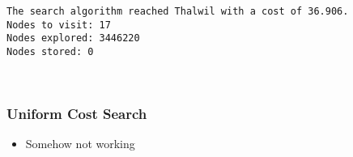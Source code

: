 \documentclass[11pt]{article}
\providecommand{\tightlist}{%
      \setlength{\itemsep}{0pt}\setlength{\parskip}{0pt}}
\begin{document}
    \begin{Verbatim}[commandchars=\\\{\}]
The search algorithm reached Thalwil with a cost of 36.906.
Nodes to visit: 17
Nodes explored: 3446220
Nodes stored: 0

    \end{Verbatim}

    \begin{center}
    \end{center}
    { \hspace*{\fill} \\}
    
    \hypertarget{uniform-cost-search}{%
\subsubsection{Uniform Cost Search}\label{uniform-cost-search}}

\begin{itemize}
\tightlist
\item
  Somehow not working
\end{itemize}
\end{document}
